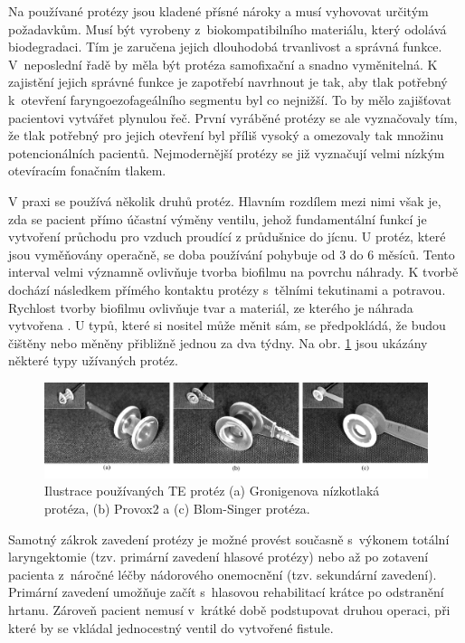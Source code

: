 Na používané protézy jsou kladené
přísné nároky a musí vyhovovat určitým požadavkům. Musí být vyrobeny
z~biokompatibilního materiálu, který odolává biodegradaci. Tím je zaručena jejich
dlouhodobá trvanlivost a správná funkce. V~neposlední řadě by měla být protéza
samofixační a snadno vyměnitelná.
 K zajistění jejich správné funkce je zapotřebí navrhnout je tak, aby
tlak potřebný  k~otevření faryngoezofageálního segmentu byl co nejnižší. To by mělo zajišťovat pacientovi vytvářet
plynulou řeč. První vyráběné protézy se ale vyznačovaly tím, že tlak potřebný pro jejich otevření byl příliš vysoký a omezovaly tak množinu potencionálních pacientů. Nejmodernější protézy se již vyznačují
velmi nízkým otevíracím fonačním tlakem.

V praxi se používá několik druhů protéz. Hlavním rozdílem mezi nimi však je,
zda se pacient přímo účastní výměny ventilu, jehož fundamentální funkcí je
vytvoření průchodu pro vzduch proudící z průdušnice do jícnu. U protéz, které
jsou vyměňovány operačně, se doba používání pohybuje od 3 do 6 měsíců. Tento
interval velmi významně ovlivňuje tvorba biofilmu na povrchu náhrady. K tvorbě
dochází následkem přímého kontaktu protézy s~tělními tekutinami a potravou.
Rychlost tvorby biofilmu ovlivňuje tvar a materiál, ze kterého je náhrada
vytvořena \cite{Leunisse2001}. U typů, které si nositel může měnit sám, se
předpokládá, že budou čištěny nebo měněny přibližně jednou za dva týdny. Na obr. \ref{fig:cause:treatment:prosthesis} jsou
ukázány některé typy užívaných protéz.

\begin{figure}[htb]
  \begin{center}
    \includegraphics[width=0.9\linewidth]{ch3-cause/figures/te-protezy}
    \caption[Ilustrace používaných TE protéz.]{Ilustrace používaných TE protéz (a) Gronigenova nízkotlaká protéza, (b) Provox2 a (c) Blom-Singer protéza.}
    \label{fig:cause:treatment:prosthesis}
  \end{center}
\end{figure}


Samotný zákrok zavedení protézy je možné provést současně s~výkonem totální
laryngektomie (tzv. primární zavedení hlasové protézy) nebo až po zotavení
pacienta z~náročné léčby nádorového onemocnění (tzv. sekundární zavedení).
Primární zavedení umožňuje začít s~hlasovou rehabilitací krátce po odstranění
hrtanu. Zároveň pacient nemusí v~krátké době podstupovat druhou operaci, při
které by se vkládal jednocestný ventil do vytvořené fistule.



